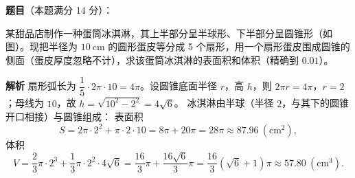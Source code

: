 \begin{answer}

\textbf{题目}（本题满分 14 分）：

某甜品店制作一种蛋筒冰淇淋，其上半部分呈半球形、下半部分呈圆锥形（如图）。现把半径为 $10\ \mathrm{cm}$ 的圆形蛋皮等分成 5 个扇形，用一个扇形蛋皮围成圆锥的侧面（蛋皮厚度忽略不计），求该蛋筒冰淇淋的表面积和体积（精确到 $0.01$）。
\nopagebreak[4]
\begin{center}\end{center}
\nopagebreak[4]
\textbf{解析}
扇形弧长为 $\dfrac15\cdot2\pi\cdot10=4\pi$。设圆锥底面半径 $r$，高 $h$，则 $2\pi r=4\pi$，$r=2$；母线为 $10$，故 $h=\sqrt{10^2-2^2}=4\sqrt6$。
冰淇淋由半球（半径 $2$，与其下的圆锥开口相接）与圆锥组成：
表面积
\nopagebreak[4]
\[S=2\pi\cdot2^2+\pi\cdot2\cdot10=8\pi+20\pi=28\pi\approx87.96\ (\mathrm{cm}^2),\]
体积
\nopagebreak[4]
\[V=\frac23\pi\cdot2^3+\frac13\pi\cdot2^2\cdot4\sqrt6=\frac{16}{3}\pi+\frac{16\sqrt6}{3}\pi=\frac{16}{3}(\sqrt6+1)\pi\approx57.80\ (\mathrm{cm}^3).\]


\end{answer}
